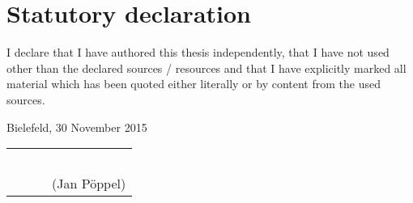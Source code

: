 \chapter{Statutory declaration}

  I declare that I have authored this thesis independently, that I have not used other than the declared sources / resources and that I have explicitly marked all material which has been quoted either literally or by content from the used sources. 


\vspace*{1.5\baselineskip}
Bielefeld, 30 November 2015


  \begin{table}[ht!]
        \begin{tabular}{p{200pt}p{50pt}p{150pt}}
           ~ & ~ & ~ \\  \cline{3-3}
           & ~ & \centering(Jan Pöppel) \\
        \end{tabular}
  \end{table}

